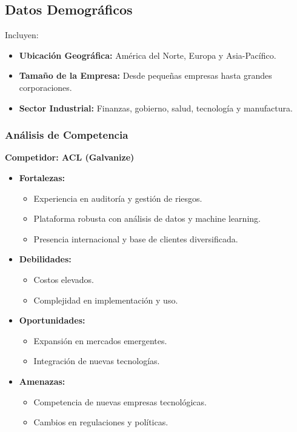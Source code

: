 \documentclass[a4paper,12pt]{article}
\begin{document}
\subsection{Datos Demográficos}
Incluyen:

\begin{itemize}
    \item \textbf{Ubicación Geográfica:} América del Norte, Europa y Asia-Pacífico.
    \item \textbf{Tamaño de la Empresa:} Desde pequeñas empresas hasta grandes corporaciones.
    \item \textbf{Sector Industrial:} Finanzas, gobierno, salud, tecnología y manufactura.
\end{itemize}

\subsubsection{Análisis de Competencia}
\textbf{Competidor: ACL (Galvanize)}

\begin{itemize}
    \item \textbf{Fortalezas:}
    \begin{itemize}
        \item Experiencia en auditoría y gestión de riesgos.
        \item Plataforma robusta con análisis de datos y machine learning.
        \item Presencia internacional y base de clientes diversificada.
    \end{itemize}
    \item \textbf{Debilidades:}
    \begin{itemize}
        \item Costos elevados.
        \item Complejidad en implementación y uso.
    \end{itemize}
    \item \textbf{Oportunidades:}
    \begin{itemize}
        \item Expansión en mercados emergentes.
        \item Integración de nuevas tecnologías.
    \end{itemize}
    \item \textbf{Amenazas:}
    \begin{itemize}
        \item Competencia de nuevas empresas tecnológicas.
        \item Cambios en regulaciones y políticas.
    \end{itemize}
\end{itemize}
\end{document}
